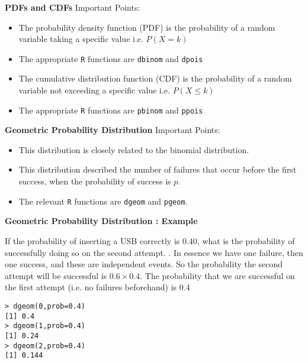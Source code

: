 \documentclass[a4]{beamer}
\begin{document}
{
\textbf{PDFs and CDFs}
Important Points:
\begin{itemize}
\item The probability density function (PDF) is the probability of a random variable taking a specific value i.e. $P(X = k)$
\item The appropriate \texttt{R} functions are \texttt{dbinom} and \texttt{dpois}
\item The cumulative distribution function (CDF) is the probability of a random variable not exceeding a specific value i.e. $P(X \leq k)$
\item The appropriate \texttt{R} functions are \texttt{pbinom} and \texttt{ppois}     
\end{itemize}
}

{
\textbf{Geometric Probability Distribution}
Important Points:
\begin{itemize}
\item This distribution is closely related to the binomial distribution. 
\item This distribution described the number of failures that occur before the first success, when the probability of success is $p$.
\item The relevant \texttt{R} functions are \texttt{dgeom} and \texttt{pgeom}.
\end{itemize}
}


\textbf{Geometric Probability Distribution : Example}

If the probability of inserting a USB correctly is $0.40$, what is the probability of successfully doing so on the second attempt.
\bigskip.
In essence we have one failure, then one success, and these are independent events. So the probability the second attempt will be successful is $0.6 \times 0.4$. The probability that we are successful on the first attempt (i.e. no failures beforehand) is 0.4

\begin{verbatim}
> dgeom(0,prob=0.4)
[1] 0.4
> dgeom(1,prob=0.4)
[1] 0.24
> dgeom(2,prob=0.4)
[1] 0.144
\end{verbatim}
\end{document}
